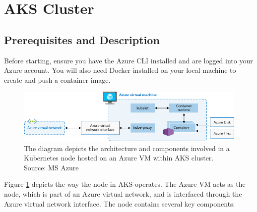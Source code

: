 \documentclass{article}
\begin{document}
\section{AKS Cluster} 

\subsection{Prerequisites and Description}

Before starting, ensure you have the Azure CLI installed and are logged into your Azure account. You will also need Docker installed on your local machine to create and push a container image.

\begin{figure}[H]
\includegraphics[scale=.63]{figures/aks-node-resource-interactions.png}
\caption{The diagram depicts the architecture and components involved in a Kubernetes node hosted on an Azure VM within AKS cluster. Source: MS Azure}
\label{fig:aks_node}
\end{figure}

Figure \ref{fig:aks_node} depicts the way the node in AKS operates. The Azure VM acts as the node, which is part of an Azure virtual network, and is interfaced through the Azure virtual network interface.   The node contains several key components:
\end{document}
